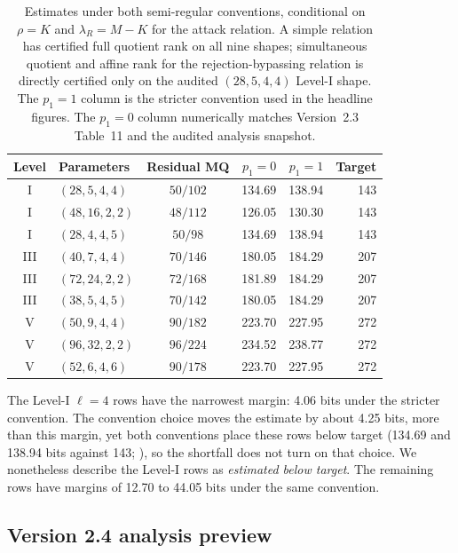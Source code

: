 \documentclass[11pt]{article}
\begin{document}
\begin{table}[t]
\centering
\caption{Estimates under both semi-regular conventions, conditional on $\rho=K$ and $\lambda_R=M-K$ for the attack relation.  A simple relation has certified full quotient rank on all nine shapes; simultaneous quotient and affine rank for the rejection-bypassing relation is directly certified only on the audited $(28,5,4,4)$ Level-I shape.  The $p_1=1$ column is the stricter convention used in the headline figures.  The $p_1=0$ column numerically matches Version~2.3 Table~11 and the audited analysis snapshot.}\label{tab:both}
\small
\setlength{\tabcolsep}{4pt}
\begin{tabular}{@{}c l c r r r@{}}
\toprule
Level & Parameters & Residual MQ & $p_1=0$ & $p_1=1$ & Target\\
\midrule
I   & $(28,5,4,4)$  & $50/102$ & 134.69 & 138.94 & 143\\
I   & $(48,16,2,2)$ & $48/112$ & 126.05 & 130.30 & 143\\
I   & $(28,4,4,5)$  & $50/98$  & 134.69 & 138.94 & 143\\
III & $(40,7,4,4)$  & $70/146$ & 180.05 & 184.29 & 207\\
III & $(72,24,2,2)$ & $72/168$ & 181.89 & 184.29 & 207\\
III & $(38,5,4,5)$  & $70/142$ & 180.05 & 184.29 & 207\\
V   & $(50,9,4,4)$  & $90/182$ & 223.70 & 227.95 & 272\\
V   & $(96,32,2,2)$ & $96/224$ & 234.52 & 238.77 & 272\\
V   & $(52,6,4,6)$  & $90/178$ & 223.70 & 227.95 & 272\\
\bottomrule
\end{tabular}
\end{table}

The Level-I $\ell=4$ rows have the narrowest margin: 4.06 bits under the stricter convention.  The convention choice moves the estimate by about 4.25 bits, more than this margin, yet both conventions place these rows below target (134.69 and 138.94 bits against 143; ), so the shortfall does not turn on that choice.  We nonetheless describe the Level-I rows as \emph{estimated below target}.  The remaining rows have margins of 12.70 to 44.05 bits under the same convention.

\subsection{Version 2.4 analysis preview}\label{sec:snova24}
\end{document}
